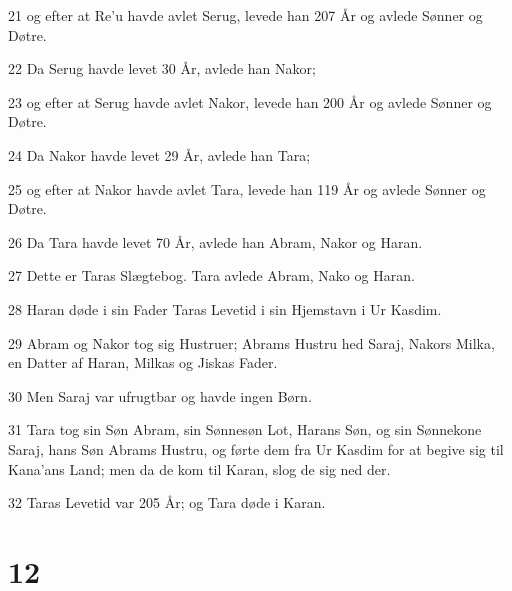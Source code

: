 \par 21 og efter at Re'u havde avlet Serug, levede han 207 År og avlede Sønner og Døtre.
\par 22 Da Serug havde levet 30 År, avlede han Nakor;
\par 23 og efter at Serug havde avlet Nakor, levede han 200 År og avlede Sønner og Døtre.
\par 24 Da Nakor havde levet 29 År, avlede han Tara;
\par 25 og efter at Nakor havde avlet Tara, levede han 119 År og avlede Sønner og Døtre.
\par 26 Da Tara havde levet 70 År, avlede han Abram, Nakor og Haran.
\par 27 Dette er Taras Slægtebog. Tara avlede Abram, Nako og Haran.
\par 28 Haran døde i sin Fader Taras Levetid i sin Hjemstavn i Ur Kasdim.
\par 29 Abram og Nakor tog sig Hustruer; Abrams Hustru hed Saraj, Nakors Milka, en Datter af Haran, Milkas og Jiskas Fader.
\par 30 Men Saraj var ufrugtbar og havde ingen Børn.
\par 31 Tara tog sin Søn Abram, sin Sønnesøn Lot, Harans Søn, og sin Sønnekone Saraj, hans Søn Abrams Hustru, og førte dem fra Ur Kasdim for at begive sig til Kana'ans Land; men da de kom til Karan, slog de sig ned der.
\par 32 Taras Levetid var 205 År; og Tara døde i Karan.

\chapter{12}


